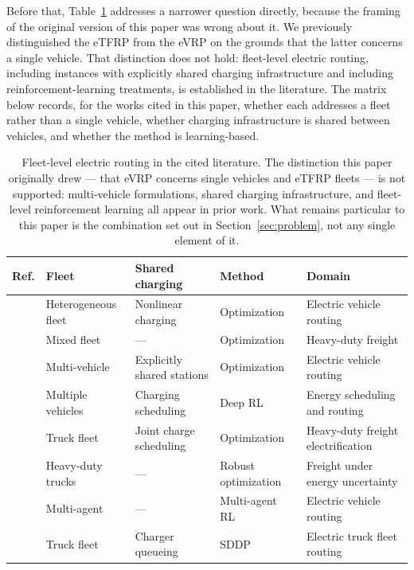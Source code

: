 \documentclass[a4paper,fleqn]{cas-sc}
\begin{document}
Before that, Table~\ref{tab:fleet_matrix} addresses a narrower question directly, because the framing of the original version of this paper was wrong about it. We previously distinguished the eTFRP from the eVRP on the grounds that the latter concerns a single vehicle. That distinction does not hold: fleet-level electric routing, including instances with explicitly shared charging infrastructure and including reinforcement-learning treatments, is established in the literature. The matrix below records, for the works cited in this paper, whether each addresses a fleet rather than a single vehicle, whether charging infrastructure is shared between vehicles, and whether the method is learning-based.

\begin{table}[t]
\centering
\caption{Fleet-level electric routing in the cited literature. The distinction this paper originally drew --- that eVRP concerns single vehicles and eTFRP fleets --- is not supported: multi-vehicle formulations, shared charging infrastructure, and fleet-level reinforcement learning all appear in prior work. What remains particular to this paper is the combination set out in Section~\ref{sec:problem}, not any single element of it.}
\label{tab:fleet_matrix}
\small
\begin{tabular}{p{3.4cm}p{2.1cm}p{2.3cm}p{2.0cm}p{4.2cm}}
\toprule
\textbf{Ref.} & \textbf{Fleet} & \textbf{Shared charging} & \textbf{Method} & \textbf{Domain} \\
\midrule
\cite{WANG2025104932} & Heterogeneous fleet & Nonlinear charging & Optimization & Electric vehicle routing \\
\cite{WANG2024123407} & Mixed fleet & --- & Optimization & Heavy-duty freight \\
\cite{https://doi.org/10.1111/itor.12620} & Multi-vehicle & Explicitly shared stations & Optimization & Electric vehicle routing \\
\cite{ALQAHTANI2022122626} & Multiple vehicles & Charging scheduling & Deep RL & Energy scheduling and routing \\
\cite{BRAGIN2024104494} & Truck fleet & Joint charge scheduling & Optimization & Heavy-duty freight electrification \\
\cite{AMIRI2023109108} & Heavy-duty trucks & --- & Robust optimization & Freight under energy uncertainty \\
\cite{10310266} & Multi-agent & --- & Multi-agent RL & Electric vehicle routing \\
\cite{ziyan2025} & Truck fleet & Charger queueing & SDDP & Electric truck fleet routing \\
\bottomrule
\end{tabular}
\end{table}
\end{document}
